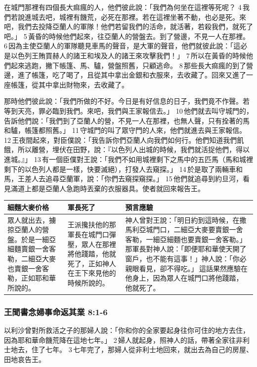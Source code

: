 在城門那裡有四個長大痲瘋的人，他們彼此說：「我們為何坐在這裡等死呢？ 4 我們若說進城去吧，城裡有饑荒，必死在那裡。若在這裡坐著不動，也必是死。來吧，我們去投降亞蘭人的軍隊！他們若留我們的活命，就活著，若殺我們，就死了吧。」 5 黃昏的時候他們起來，往亞蘭人的營盤去。到了營邊，不見一人在那裡。 6 因為主使亞蘭人的軍隊聽見車馬的聲音，是大軍的聲音，他們就彼此說：「這必是以色列王賄買赫人的諸王和埃及人的諸王來攻擊我們！」 7 所以在黃昏的時候他們起來逃跑，撇下帳篷、馬、驢，營盤照舊，只顧逃命。 8 那些長大痲瘋的到了營邊，進了帳篷，吃了喝了，且從其中拿出金銀和衣服來，去收藏了。回來又進了一座帳篷，從其中拿出財物來，去收藏了。

那時他們彼此說：「我們所做的不好。今日是有好信息的日子，我們竟不作聲。若等到天亮，罪必臨到我們。來吧，我們與王家報信去。」 10 他們就去叫守城門的，告訴他們說：「我們到了亞蘭人的營，不見一人在那裡，也無人聲，只有拴著的馬和驢，帳篷都照舊。」 11 守城門的叫了眾守門的人來，他們就進去與王家報信。 12 王夜間起來，對臣僕說：「我告訴你們亞蘭人向我們如何行。他們知道我們飢餓，所以離營，埋伏在田野，說：『以色列人出城的時候，我們就活捉他們，得以進城。』」 13 有一個臣僕對王說：「我們不如用城裡剩下之馬中的五匹馬（馬和城裡剩下的以色列人都是一樣，快要滅絕），打發人去窺探。」 14 於是取了兩輛車和馬，王差人去追尋亞蘭軍，說：「你們去窺探窺探。」 15 他們就追尋到約旦河，看見滿道上都是亞蘭人急跑時丟棄的衣服器具。使者就回來報告王。

\begin{tabular}{p{3.75cm}|p{3.5cm}|p{9.25cm}}\hline
細麵大麥价格&軍長死了&預言應驗\\\hline
眾人就出去，擄掠亞蘭人的營盤。於是一細亞細麵賣銀一舍客勒，二細亞大麥也賣銀一舍客勒，正如耶和華所說的。&王派攙扶他的那軍長在城門口彈壓，眾人在那裡將他踐踏，他就死了，正如神人在王下來見他的時候所說的。&神人曾對王說：「明日約到這時候，在撒馬利亞城門口，二細亞大麥要賣銀一舍客勒，一細亞細麵也要賣銀一舍客勒。」那軍長對神人說：「即便耶和華使天開了窗戶，也不能有這事！」神人說：「你必親眼看見，卻不得吃。」 這話果然應驗在他身上，因為眾人在城門口將他踐踏，他就死了。\\\hline
\end{tabular}



\subsubsection{王聞書念婦事命返其業 8:1-6}
以利沙曾對所救活之子的那婦人說：「你和你的全家要起身往你可住的地方去住，因為耶和華命饑荒降在這地七年。」 2 婦人就起身，照神人的話，帶著全家往非利士地去，住了七年。 3 七年完了，那婦人從非利士地回來，就出去為自己的房屋、田地哀告王。

